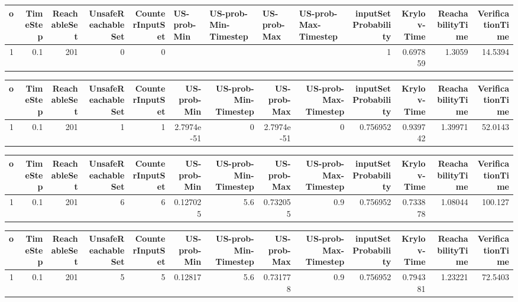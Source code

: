 \begin{tabular}{rrrrrllllrrrr}
\hline
   o &   TimeStep &   ReachableSet &   UnsafeReachableSet &   CounterInputSet & US-prob-Min   & US-prob-Min-Timestep   & US-prob-Max   & US-prob-Max-Timestep   &   inputSet Probability &   Krylov-Time &   ReachabilityTime &   VerificationTime \\
\hline
   1 &        0.1 &            201 &                    0 &                 0 &               &                        &               &                        &                      1 &      0.697859 &             1.3059 &            14.5394 \\
\hline
\end{tabular}
\begin{tabular}{rrrrrrrrrrrrr}
\hline
   o &   TimeStep &   ReachableSet &   UnsafeReachableSet &   CounterInputSet &   US-prob-Min &   US-prob-Min-Timestep &   US-prob-Max &   US-prob-Max-Timestep &   inputSet Probability &   Krylov-Time &   ReachabilityTime &   VerificationTime \\
\hline
   1 &        0.1 &            201 &                    1 &                 1 &    2.7974e-51 &                      0 &    2.7974e-51 &                      0 &               0.756952 &      0.939742 &            1.39971 &            52.0143 \\
\hline
\end{tabular}
\begin{tabular}{rrrrrrrrrrrrr}
\hline
   o &   TimeStep &   ReachableSet &   UnsafeReachableSet &   CounterInputSet &   US-prob-Min &   US-prob-Min-Timestep &   US-prob-Max &   US-prob-Max-Timestep &   inputSet Probability &   Krylov-Time &   ReachabilityTime &   VerificationTime \\
\hline
   1 &        0.1 &            201 &                    6 &                 6 &      0.127025 &                    5.6 &      0.732055 &                    0.9 &               0.756952 &      0.733878 &            1.08044 &            100.127 \\
\hline
\end{tabular}
\begin{tabular}{rrrrrrrrrrrrr}
\hline
   o &   TimeStep &   ReachableSet &   UnsafeReachableSet &   CounterInputSet &   US-prob-Min &   US-prob-Min-Timestep &   US-prob-Max &   US-prob-Max-Timestep &   inputSet Probability &   Krylov-Time &   ReachabilityTime &   VerificationTime \\
\hline
   1 &        0.1 &            201 &                    5 &                 5 &       0.12817 &                    5.6 &      0.731778 &                    0.9 &               0.756952 &      0.794381 &            1.23221 &            72.5403 \\
\hline
\end{tabular}
